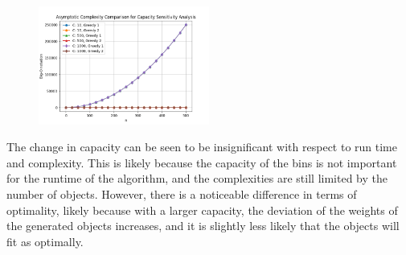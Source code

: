 \documentclass[11pt]{article}
\begin{document}
\begin{figure}[H]
	\centering
	\includegraphics[width=0.5\textwidth]{images/s1_complexity.png}
\end{figure}
The change in capacity can be seen to be insignificant with respect to run time and complexity.
This is likely because the capacity of the bins is not important for the runtime of the
algorithm, and the complexities are still limited by the number of objects. However, there is a
noticeable difference in terms of optimality, likely because with a larger capacity, the
deviation of the weights of the generated objects increases, and it is slightly less likely that
the objects will fit as optimally.
\end{document}
